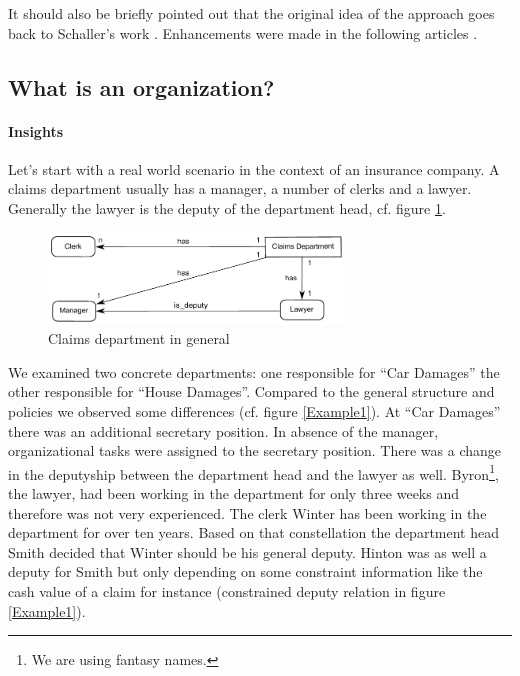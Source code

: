 It should also be briefly pointed out that the original idea of the approach goes back to Schaller's work  \cite{Schaller98}. Enhancements were made in the following articles \cite{Lawall2014, Lawall2014a, Lawall2014b, Lawall2014d, Lawall2014c, Lawall2013, Lawall2011}. 


\subsection{What is an organization?}

\paragraph{Insights}
Let's start with a real world scenario in the context of an insurance company. A claims department usually has a manager, a number of clerks and a lawyer. Generally the lawyer is the deputy of the department head, cf. figure \ref{GeneralDep}. 
	\begin{figure}[htb!]
	\centering
	\includegraphics[width=0.7\textwidth]{Figures/ExampleDepartmentGeneral.pdf}
	\caption{Claims department in general}
	\label{GeneralDep}
	\end{figure}

We examined two concrete departments: one responsible for ``Car Damages'' the other responsible for ``House Damages''. Compared to the general structure and policies we observed some differences (cf. figure \ref{Example1}). At ``Car Damages'' there was an additional secretary position. In absence of the manager, organizational tasks were assigned to the secretary position. There was a change in the deputyship between the department head and the lawyer as well. Byron\footnote{We are using fantasy names.}, the lawyer, had been working in the department for only three weeks and therefore was not very experienced. The clerk Winter has been working in the department for over ten years. Based on that constellation the department head Smith decided that Winter should be his general deputy. Hinton was as well a deputy for Smith but only depending on some constraint information like the cash value of a claim for instance (constrained deputy relation in figure \ref{Example1}). 
	
